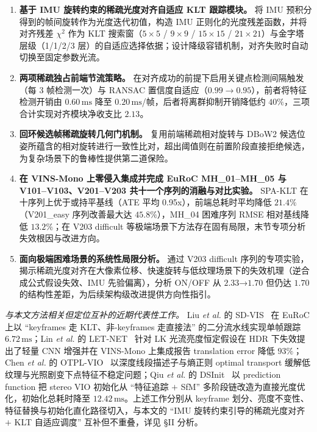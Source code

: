 \documentclass[letterpaper,journal]{IEEEtran}
\begin{document}
\begin{enumerate}
\item \textbf{基于 IMU 旋转约束的稀疏光度对齐自适应 KLT 跟踪模块。} 将 IMU 预积分得到的帧间旋转作为光度迭代初值，构造 IMU 正则化的光度残差函数，并将对齐残差 $\chi^2$ 作为 KLT 搜索窗（$5{\times}5$ / $9{\times}9$ / $15{\times}15$ / $21{\times}21$）与金字塔层级（1/1/2/3 层）的自适应选择依据；设计降级容错机制，对齐失败时自动切换至固定参数光流。
\item \textbf{两项稀疏独占前端节流策略。} 在对齐成功的前提下启用关键点检测间隔触发（每 3 帧检测一次）与 RANSAC 置信度自适应（$0.99 \to 0.95$），前者将特征检测开销由 $0.60\,\mathrm{ms}$ 降至 $0.20\,\mathrm{ms}$/帧，后者将离群抑制开销降低约 $40\%$，三项合计实现对齐模块净收支比 $2.13$。
\item \textbf{回环候选帧稀疏旋转几何门机制。} 复用前端稀疏相对旋转与 DBoW2 候选位姿所蕴含的相对旋转进行一致性比对，超出阈值则在前置阶段直接拒绝候选，为复杂场景下的鲁棒性提供第二道保险。
\item \textbf{在 VINS-Mono 上零侵入集成并完成 EuRoC MH\_01--MH\_05 与 V101--V103、V201--V203 共十一个序列的消融与对比实验。} SPA-KLT 在十序列上优于或持平基线（ATE 平均 0.95x），前端总耗时平均降低 $21.4\%$（V201\_easy 序列改善最大达 $45.8\%$），MH\_04 困难序列 RMSE 相对基线降低 $13.2\%$；在 V203 difficult 等极端场景下方法存在固有局限，末节专项分析失效根因与改进方向。
\item \textbf{面向极端困难场景的系统性局限分析。} 通过 V203 difficult 序列的专项实验，揭示稀疏光度对齐在大像素位移、快速旋转与低纹理场景下的失效机理（逆合成公式假设失效、IMU 先验偏离），分析 ON/OFF 从 $2.33$→$1.70$ 但仍达 $1.70$ 的结构性差距，为后续架构级改进提供方向性指引。
\end{enumerate}

\textit{与本文方法相关但定位互补的近期代表性工作。} Liu \emph{et al.} 的 SD-VIS~\cite{liu2020sdvis} 在 EuRoC 上以 ``keyframes 走 KLT、非-keyframes 走直接法'' 的二分流水线实现单帧跟踪 $6.72\,\mathrm{ms}$；Lin \emph{et al.} 的 LET-NET~\cite{lin2024letnet} 针对 LK 光流亮度恒定假设在 HDR 下失效提出了轻量 CNN 增强并在 VINS-Mono 上集成报告 translation error 降低 $93\%$；Chen \emph{et al.} 的 OTPL-VIO~\cite{chen2026otpl} 以深度线段描述子与熵正则 optimal transport 缓解低纹理与光照剧变下点特征不稳定问题；Qiu \emph{et al.} 的 DSInit~\cite{qiu2026dsinit} 以 prediction function 把 stereo VIO 初始化从 ``特征追踪 $+$ SfM'' 多阶段链改造为直接光度优化，初始化总耗时降至 $12.42\,\mathrm{ms}$。上述工作分别从 keyframe 划分、亮度不变性、特征替换与初始化直化路径切入，与本文的 ``IMU 旋转约束引导的稀疏光度对齐 $+$ KLT 自适应调度'' 互补但不重叠，详见 §II 分析。
\end{document}
